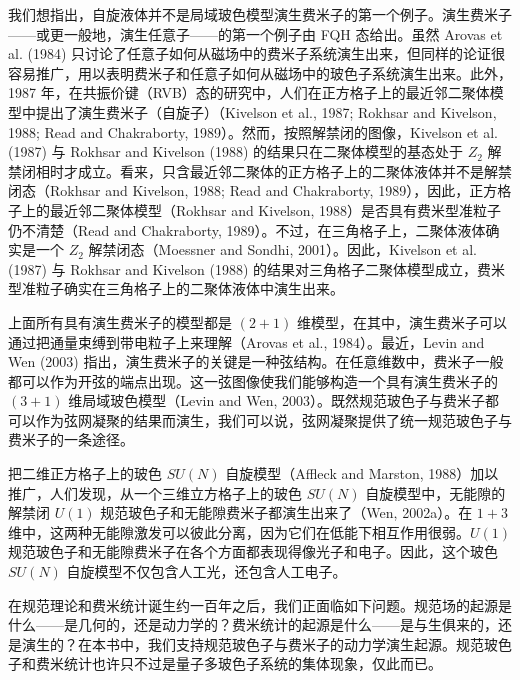我们想指出，自旋液体并不是局域玻色模型演生费米子的第一个例子。演生费米子——或更一般地，演生任意子——的第一个例子由 FQH 态给出。虽然 Arovas et al. (1984) 只讨论了任意子如何从磁场中的费米子系统演生出来，但同样的论证很容易推广，用以表明费米子和任意子如何从磁场中的玻色子系统演生出来。此外，1987 年，在共振价键（RVB）态的研究中，人们在正方格子上的最近邻二聚体模型中提出了演生费米子（自旋子）（Kivelson et al., 1987; Rokhsar and Kivelson, 1988; Read and Chakraborty, 1989）。然而，按照解禁闭的图像，Kivelson et al. (1987) 与 Rokhsar and Kivelson (1988) 的结果只在二聚体模型的基态处于 $Z_2$ 解禁闭相时才成立。看来，只含最近邻二聚体的正方格子上的二聚体液体并不是解禁闭态（Rokhsar and Kivelson, 1988; Read and Chakraborty, 1989），因此，正方格子上的最近邻二聚体模型（Rokhsar and Kivelson, 1988）是否具有费米型准粒子仍不清楚（Read and Chakraborty, 1989）。不过，在三角格子上，二聚体液体确实是一个 $Z_2$ 解禁闭态（Moessner and Sondhi, 2001）。因此，Kivelson et al. (1987) 与 Rokhsar and Kivelson (1988) 的结果对三角格子二聚体模型成立，费米型准粒子确实在三角格子上的二聚体液体中演生出来。

上面所有具有演生费米子的模型都是 $(2+1)$ 维模型，在其中，演生费米子可以通过把通量束缚到带电粒子上来理解（Arovas et al., 1984）。最近，Levin and Wen (2003) 指出，演生费米子的关键是一种弦结构。在任意维数中，费米子一般都可以作为开弦的端点出现。这一弦图像使我们能够构造一个具有演生费米子的 $(3+1)$ 维局域玻色模型（Levin and Wen, 2003）。既然规范玻色子与费米子都可以作为弦网凝聚的结果而演生，我们可以说，弦网凝聚提供了统一规范玻色子与费米子的一条途径。

把二维正方格子上的玻色 $SU(N)$ 自旋模型（Affleck and Marston, 1988）加以推广，人们发现，从一个三维立方格子上的玻色 $SU(N)$ 自旋模型中，无能隙的解禁闭 $U(1)$ 规范玻色子和无能隙费米子都演生出来了（Wen, 2002a）。在 $1+3$ 维中，这两种无能隙激发可以彼此分离，因为它们在低能下相互作用很弱。$U(1)$ 规范玻色子和无能隙费米子在各个方面都表现得像光子和电子。因此，这个玻色 $SU(N)$ 自旋模型不仅包含人工光，还包含人工电子。

在规范理论和费米统计诞生约一百年之后，我们正面临如下问题。规范场的起源是什么——是几何的，还是动力学的？费米统计的起源是什么——是与生俱来的，还是演生的？在本书中，我们支持规范玻色子与费米子的动力学演生起源。规范玻色子和费米统计也许只不过是量子多玻色子系统的集体现象，仅此而已。
